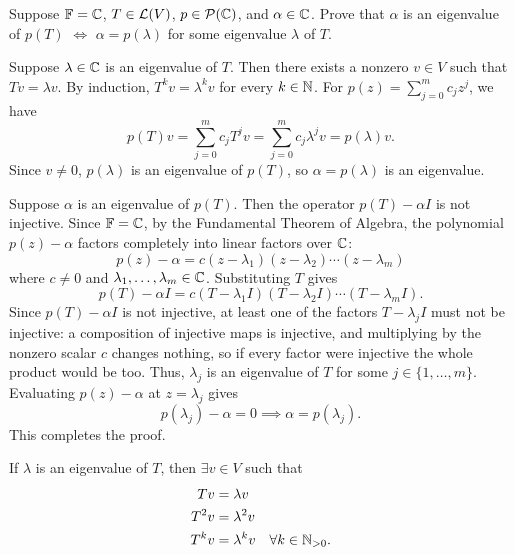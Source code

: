 \begin{xrcs}
  Suppose $\mathbb{F} = \mathbb{C}$, $T \in \mathcal{L}(V)$, $p \in \mathcal{P}(\mathbb{C})$, and $\alpha \in \mathbb{C}$. Prove that $\alpha$ is an eigenvalue of $p(T)$ $\iff$ $\alpha = p(\lambda)$ for some eigenvalue $\lambda$ of $T$.

  \begin{xprf}
    \Leftarrowdirection Suppose $\lambda \in \mathbb{C}$ is an eigenvalue of $T$. Then there exists a nonzero $v \in V$ such that $Tv = \lambda v$.
    By induction, $T^k v = \lambda^k v$ for every $k \in \mathbb{N}$.
    For $p(z) = \sum_{j=0}^m c_j z^j$, we have
    \begin{equation}
      p(T)v = \sum_{j=0}^m c_j T^j v = \sum_{j=0}^m c_j \lambda^j v = p(\lambda) v.
    \end{equation}
    Since $v \neq 0$, $p(\lambda)$ is an eigenvalue of $p(T)$, so $\alpha = p(\lambda)$ is an eigenvalue.

    \Rightarrowdirection Suppose $\alpha$ is an eigenvalue of $p(T)$.
    Then the operator $p(T) - \alpha I$ is not injective.
    Since $\mathbb{F} = \mathbb{C}$, by the Fundamental Theorem of Algebra, the polynomial $p(z) - \alpha$ factors completely into linear factors over $\mathbb{C}$:
    \begin{equation}
      p(z) - \alpha = c(z - \lambda_1)(z - \lambda_2)\cdots(z - \lambda_m)
    \end{equation}
    where $c \neq 0$ and $\lambda_1, \dots, \lambda_m \in \mathbb{C}$.
    Substituting $T$ gives
    \begin{equation}
      p(T) - \alpha I = c(T - \lambda_1 I)(T - \lambda_2 I)\cdots(T - \lambda_m I).
    \end{equation}
    Since $p(T) - \alpha I$ is not injective, at least one of the factors $T - \lambda_j I$ must not be injective: a composition of injective maps is injective, and multiplying by the nonzero scalar $c$ changes nothing, so if every factor were injective the whole product would be too.
    Thus, $\lambda_j$ is an eigenvalue of $T$ for some $j \in \{1, \dots, m\}$.
    Evaluating $p(z) - \alpha$ at $z = \lambda_j$ gives
    \begin{equation}
      p(\lambda_j) - \alpha = 0 \implies \alpha = p(\lambda_j).
    \end{equation}
    This completes the proof.
  \end{xprf}

  \begin{failedattempt}
    If $\lambda$ is an eigenvalue of $T$, then $\exists v \in V$ such that
    \begin{equation}
      \begin{aligned}
        T v   &= \lambda   v \\
        T^2 v &= \lambda^2 v \\
        T^k v &= \lambda^k v \quad \forall k \in \mathbb{N}_{>0}.
      \end{aligned}
    \end{equation}


\end{failedattempt}
\end{xrcs}
